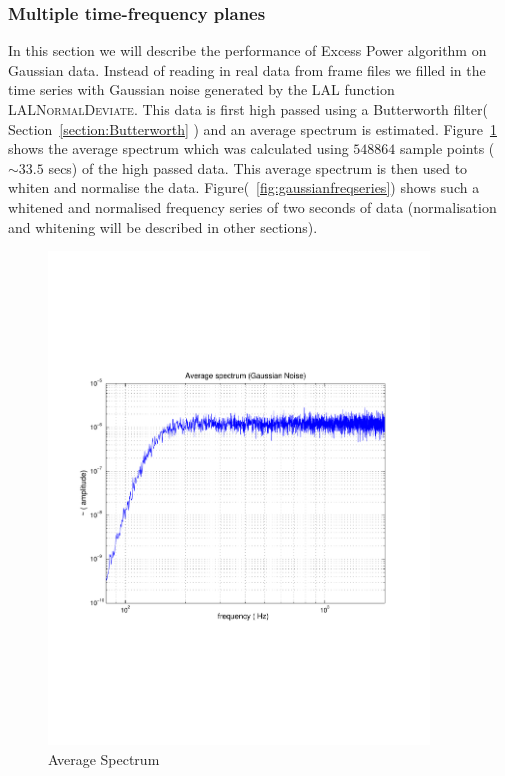 \subsubsection{Multiple time-frequency planes}
In this section we will describe the performance of Excess Power algorithm  
on Gaussian data.  Instead of reading in real data from frame files we filled 
in the time series with Gaussian noise generated by the LAL 
function \textsc{LALNormalDeviate}.  This data is first high passed using
a Butterworth filter( Section~\ref{section:Butterworth} ) and an 
average spectrum is estimated.  Figure~\ref{fig:gaussianspectrum} shows the 
average spectrum which was calculated using $548864$ sample points
($\sim 33.5$ secs) of the high passed data.  This average spectrum is then 
used to whiten and normalise the data.   Figure(~\ref{fig:gaussianfreqseries}) 
shows such a whitened and normalised frequency series of two seconds of data 
(normalisation and whitening will be described in other sections).
\begin{figure}[h]
\begin{center}
\includegraphics[width=0.9\textwidth]{figures/averagespec_psd}
\caption{Average Spectrum}
\label{fig:gaussianspectrum}
\end{center}
\end{figure}

